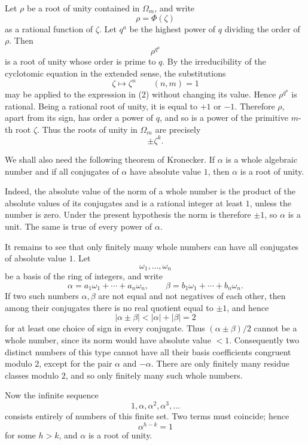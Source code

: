 \documentclass[11pt,a4paper]{book}
\begin{document}
Let \(\rho\) be a root of unity contained in \(\Omega_m\), and write
\[
  \rho=\Phi(\zeta)
\tag{1}
\]
as a rational function of \(\zeta\).  Let \(q^a\) be the highest power of \(q\) dividing the order of \(\rho\).  Then
\[
  \rho^{q^a}
\tag{2}
\]
is a root of unity whose order is prime to \(q\).  By the irreducibility of the cyclotomic equation in the extended sense, the substitutions
\[
  \zeta\mapsto\zeta^n\qquad (n,m)=1
\]
may be applied to the expression in (2) without changing its value.  Hence \(\rho^{q^a}\) is rational.  Being a rational root of unity, it is equal to \(+1\) or \(-1\).  Therefore \(\rho\), apart from its sign, has order a power of \(q\), and so is a power of the primitive \(m\)-th root \(\zeta\).  Thus the roots of unity in \(\Omega_m\) are precisely
\[
  \pm \zeta^k.
\tag{3}
\]

We shall also need the following theorem of Kronecker.  If \(\alpha\) is a whole algebraic number and if all conjugates of \(\alpha\) have absolute value \(1\), then \(\alpha\) is a root of unity.

Indeed, the absolute value of the norm of a whole number is the product of the absolute values of its conjugates and is a rational integer at least \(1\), unless the number is zero.  Under the present hypothesis the norm is therefore \(\pm1\), so \(\alpha\) is a unit.  The same is true of every power of \(\alpha\).

It remains to see that only finitely many whole numbers can have all conjugates of absolute value \(1\).  Let
\[
  \omega_1,\ldots,\omega_n
\]
be a basis of the ring of integers, and write
\[
  \alpha=a_1\omega_1+\cdots+a_n\omega_n,\qquad
  \beta=b_1\omega_1+\cdots+b_n\omega_n.
\]
If two such numbers \(\alpha,\beta\) are not equal and not negatives of each other, then among their conjugates there is no real quotient equal to \(\pm1\), and hence
\[
  |\alpha\pm\beta|<|\alpha|+|\beta|=2
\]
for at least one choice of sign in every conjugate.  Thus \((\alpha\pm\beta)/2\) cannot be a whole number, since its norm would have absolute value \(<1\).  Consequently two distinct numbers of this type cannot have all their basis coefficients congruent modulo \(2\), except for the pair \(\alpha\) and \(-\alpha\).  There are only finitely many residue classes modulo \(2\), and so only finitely many such whole numbers.

Now the infinite sequence
\[
  1,\alpha,\alpha^2,\alpha^3,\ldots
\]
consists entirely of numbers of this finite set.  Two terms must coincide; hence
\[
  \alpha^{h-k}=1
\]
for some \(h>k\), and \(\alpha\) is a root of unity.
\end{document}

